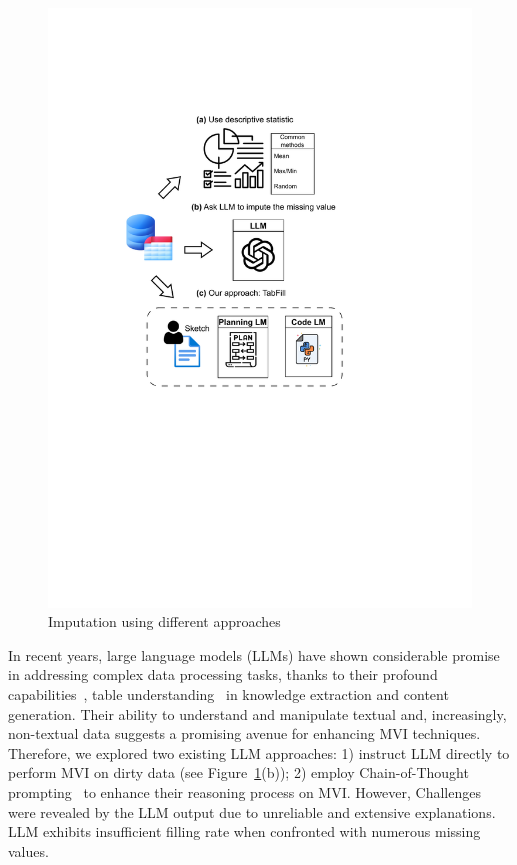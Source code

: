 \documentclass[sigconf]{acmart}
\begin{document}
\begin{figure}[h]
  \centering
  \includegraphics[width=0.7\linewidth]{methods.pdf}
  \caption{Imputation using different approaches}
  \label{fig:method}
\end{figure}

In recent years, large language models (LLMs) have shown considerable promise in addressing complex data processing tasks, thanks to their profound capabilities~\cite{zhao2023survey}, table understanding~\cite{sui2024table, zha2023tablegpt, li2023table} in knowledge extraction and content generation. Their ability to understand and manipulate textual and, increasingly, non-textual data suggests a promising avenue for enhancing MVI techniques. Therefore, we explored two existing LLM approaches: 1) instruct LLM directly to perform MVI on dirty data (see Figure~\ref{fig:method}(b)); 2) employ Chain-of-Thought prompting~\cite{wei2023chainofthought} to enhance their reasoning process on MVI. However, Challenges were revealed by the LLM output due to unreliable and extensive explanations. LLM exhibits insufficient filling rate when confronted with numerous missing values.
\end{document}
